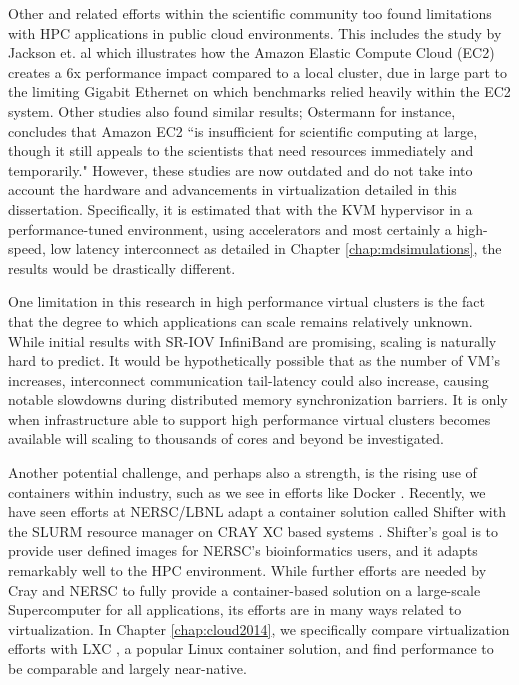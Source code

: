 Other and related efforts within the scientific community too found limitations with HPC applications in public cloud environments. This includes the study by Jackson et. al \cite{jackson2010performance} which illustrates how the Amazon Elastic Compute Cloud (EC2) creates a 6x performance impact compared to a local cluster, due in large part to the limiting Gigabit Ethernet on which benchmarks relied heavily within the EC2 system. Other studies also found similar results; Ostermann \cite{ostermann2009performance} for instance, concludes that Amazon EC2 ``is insufficient for scientific computing at large, though it still appeals to the scientists that need resources immediately and temporarily."  However, these studies are now outdated and do not take into account the hardware and advancements in virtualization detailed in this dissertation. Specifically, it is estimated that with the KVM hypervisor in a performance-tuned environment, using accelerators and most certainly a high-speed, low latency interconnect as detailed in Chapter \ref{chap:mdsimulations}, the results would be drastically different. 


One limitation in this research in high performance virtual clusters is the fact that the degree to which applications can scale remains relatively unknown. While initial results with SR-IOV InfiniBand are promising, scaling is naturally hard to predict. It would be hypothetically possible that as the number of VM's increases, interconnect communication tail-latency could also increase, causing notable slowdowns during distributed memory synchronization barriers. It is only when infrastructure able to support high performance virtual clusters becomes available will scaling to thousands of cores and beyond be investigated.  

Another potential challenge, and perhaps also a strength, is the rising use of containers within industry, such as we see in efforts like Docker \cite{merkel2014docker}. Recently, we have seen efforts at NERSC/LBNL adapt a container solution called Shifter with the SLURM resource manager on CRAY XC based systems \cite{jacobsen2015contain}. Shifter's goal is to provide user defined images for NERSC's bioinformatics users, and it adapts remarkably well to the HPC environment. While further efforts are needed by Cray and NERSC to fully provide a container-based solution on a large-scale Supercomputer for all applications, its efforts are in many ways related to virtualization. In Chapter \ref{chap:cloud2014}, we specifically compare virtualization efforts with LXC \cite{xavier2013performance}, a popular Linux container solution, and find performance to be comparable and largely near-native. 

